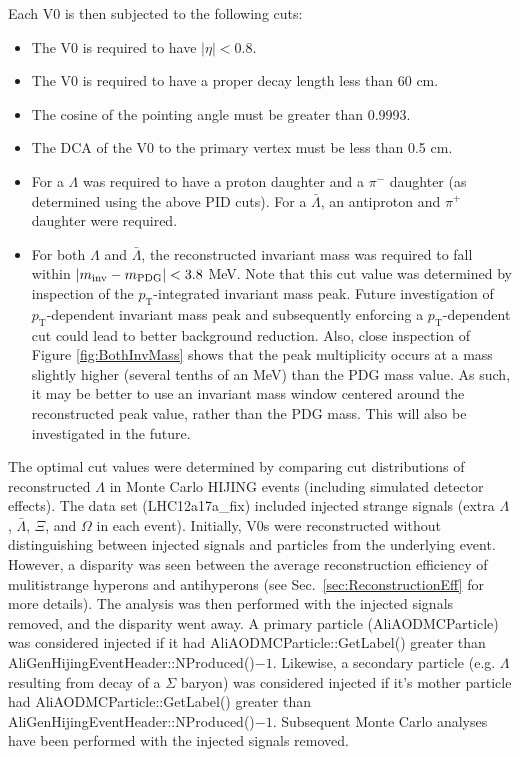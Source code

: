 Each V0 is then subjected to the following cuts:
\begin{itemize}
\item The V0 is required to have $|\eta| < 0.8$.
\item The V0 is required to have a proper decay length less than 60 cm.
\item The cosine of the pointing angle must be greater than 0.9993.
\item The DCA of the V0 to the primary vertex must be less than 0.5 cm.
\item For a $\Lambda$ was required to have a proton daughter and a $\pi^-$ daughter (as determined using the above PID cuts).  For a $\bar{\Lambda}$, an antiproton and $\pi^+$ daughter were required.
\item For both $\Lambda$ and $\bar{\Lambda}$, the reconstructed invariant mass was required to fall within $\left\lvert m_\mathrm{inv}-m_\mathrm{PDG}\right\rvert < 3.8$ MeV.  Note that this cut value was determined by inspection of the $p_\mathrm{T}$-integrated invariant mass peak.  Future investigation of $p_\mathrm{T}$-dependent invariant mass peak and subsequently enforcing a $p_\mathrm{T}$-dependent cut could lead to better background reduction.  Also, close inspection of Figure \ref{fig:BothInvMass} shows that the peak multiplicity occurs at a mass slightly higher (several tenths of an MeV) than the PDG mass value.  As such, it may be better to use an invariant mass window centered around the reconstructed peak value, rather than the PDG mass.  This will also be investigated in the future.
\end{itemize}

The optimal cut values were determined by comparing cut distributions of reconstructed $\Lambda$ in Monte Carlo HIJING events (including simulated detector effects).  The data set (LHC12a17a\_fix) included injected strange signals (extra $\Lambda$, $\bar{\Lambda}$, $\Xi$, and $\Omega$ in each event).  Initially, V0s were reconstructed without distinguishing between injected signals and particles from the underlying event.  However, a disparity was seen between the average reconstruction efficiency of mulitistrange hyperons and antihyperons (see Sec.\ \ref{sec:ReconstructionEff} for more details).  The analysis was then performed with the injected signals removed, and the disparity went away.  A primary particle (AliAODMCParticle) was considered injected if it had AliAODMCParticle::GetLabel() greater than AliGenHijingEventHeader::NProduced()$-1$. Likewise, a secondary particle (e.g. $\Lambda$ resulting from decay of a $\Sigma$ baryon) was considered injected if it's mother particle had AliAODMCParticle::GetLabel() greater than AliGenHijingEventHeader::NProduced()$-1$.  Subsequent Monte Carlo analyses have been performed with the injected signals removed.

